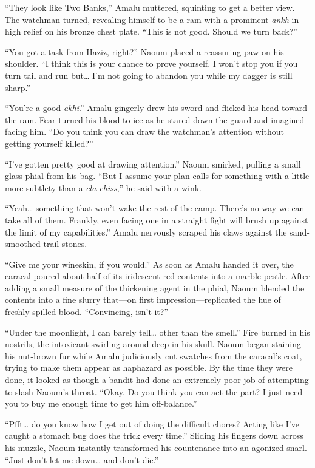 ``They look like Two Banks,'' Amalu muttered, squinting to get a better view. The watchman turned, revealing himself to be a ram with a prominent \emph{ankh} in high relief on his bronze chest plate. ``This is not good. Should we turn back?''

``You got a task from Haziz, right?'' Naoum placed a reassuring paw on his shoulder. ``I think this is your chance to prove yourself. I won't stop you if you turn tail and run but\ldots{} I'm not going to abandon you while my dagger is still sharp.''

``You're a good \emph{akhi}.'' Amalu gingerly drew his sword and flicked his head toward the ram. Fear turned his blood to ice as he stared down the guard and imagined facing him. ``Do you think you can draw the watchman's attention without getting yourself killed?''

``I've gotten pretty good at drawing attention.'' Naoum smirked, pulling a small glass phial from his bag. ``But I assume your plan calls for something with a little more subtlety than a \emph{cla-chiss},'' he said with a wink.

``Yeah\ldots{} something that won't wake the rest of the camp. There's no way we can take all of them. Frankly, even facing one in a straight fight will brush up against the limit of my capabilities.'' Amalu nervously scraped his claws against the sand-smoothed trail stones.

``Give me your wineskin, if you would.'' As soon as Amalu handed it over, the caracal poured about half of its iridescent red contents into a marble pestle. After adding a small measure of the thickening agent in the phial, Naoum blended the contents into a fine slurry that---on first impression---replicated the hue of freshly-spilled blood. ``Convincing, isn't it?''

``Under the moonlight, I can barely tell\ldots{} other than the smell.'' Fire burned in his nostrils, the intoxicant swirling around deep in his skull. Naoum began staining his nut-brown fur while Amalu judiciously cut swatches from the caracal's coat, trying to make them appear as haphazard as possible. By the time they were done, it looked as though a bandit had done an extremely poor job of attempting to slash Naoum's throat. ``Okay. Do you think you can act the part? I just need you to buy me enough time to get him off-balance.''

``Pfft\ldots{} do you know how I get out of doing the difficult chores? Acting like I've caught a stomach bug does the trick every time.'' Sliding his fingers down across his muzzle, Naoum instantly transformed his countenance into an agonized snarl. ``Just don't let me down\ldots{} and don't die.''

